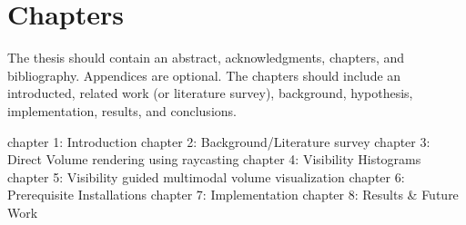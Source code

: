 \section{Chapters}
The thesis should contain an abstract, acknowledgments, chapters, and
bibliography. Appendices are optional. The chapters should include an
introducted, related work (or literature survey), background, hypothesis,
implementation, results, and conclusions.

chapter 1: Introduction
chapter 2: Background/Literature survey
chapter 3: Direct Volume rendering using raycasting
chapter 4: Visibility Histograms
chapter 5: Visibility guided multimodal volume visualization
chapter 6: Prerequisite Installations
chapter 7: Implementation
chapter 8: Results \& Future Work




